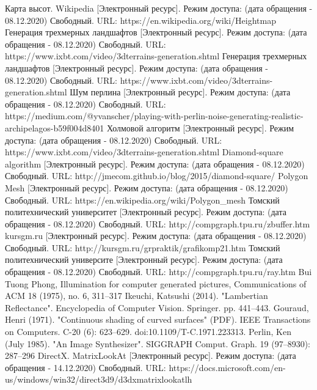 \documentclass{article}
\begin{document}
	\begin{center}
	\begin{thebibliography}{3}
	Карта высот. Wikipedia [Электронный ресурс]. Режим доступа: (дата обращения - 08.12.2020) Свободный. URL: https://en.wikipedia.org/wiki/Heightmap
Генерация трехмерных ландшафтов [Электронный ресурс]. Режим доступа: (дата обращения - 08.12.2020) Свободный. URL: https://www.ixbt.com/video/3dterrains-generation.shtml
Генерация трехмерных ландшафтов [Электронный ресурс]. Режим доступа: (дата обращения - 08.12.2020) Свободный. URL: https://www.ixbt.com/video/3dterrains-generation.shtml
Шум перлина [Электронный ресурс]. Режим доступа: (дата обращения - 08.12.2020) Свободный. URL: https://medium.com/@yvanscher/playing-with-perlin-noise-generating-realistic-archipelagos-b59f004d8401
Холмовой алгоритм [Электронный ресурс]. Режим доступа: (дата обращения - 08.12.2020) Свободный. URL: https://www.ixbt.com/video/3dterrains-generation.shtml
Diamond-square algorithm [Электронный ресурс]. Режим доступа: (дата обращения - 08.12.2020) Свободный. URL: http://jmecom.github.io/blog/2015/diamond-square/
Polygon Mesh [Электронный ресурс]. Режим доступа: (дата обращения - 08.12.2020) Свободный. URL: https://en.wikipedia.org/wiki/Polygon\_mesh
Томский политехнический университет [Электронный ресурс]. Режим доступа: (дата обращения - 08.12.2020) Свободный. URL: http://compgraph.tpu.ru/zbuffer.htm
kursgm.ru [Электронный ресурс]. Режим доступа: (дата обращения - 08.12.2020) Свободный. URL: http://kursgm.ru/grpraktik/grafikomp21.htm
Томский политехнический университе [Электронный ресурс]. Режим доступа: (дата обращения - 08.12.2020) Свободный. URL: http://compgraph.tpu.ru/ray.htm
Bui Tuong Phong, Illumination for computer generated pictures, Communications of ACM 18 (1975), no. 6, 311–317
Ikeuchi, Katsushi (2014). "Lambertian Reflectance". Encyclopedia of Computer Vision. Springer. pp. 441–443.
Gouraud, Henri (1971). "Continuous shading of curved surfaces" (PDF). IEEE Transactions on Computers. C-20 (6): 623–629. doi:10.1109/T-C.1971.223313.
Perlin, Ken (July 1985). "An Image Synthesizer". SIGGRAPH Comput. Graph. 19 (97–8930): 287–296
DirectX. MatrixLookAt [Электронный ресурс]. Режим доступа: (дата обращения - 14.12.2020) Свободный. URL: https://docs.microsoft.com/en-us/windows/win32/direct3d9/d3dxmatrixlookatlh

\end{thebibliography}
\end{center}
\end{document}
